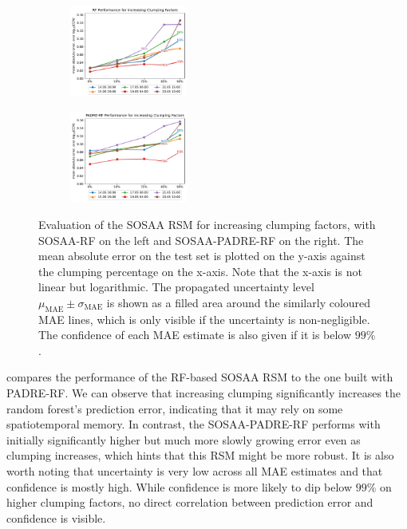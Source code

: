 \begin{figure}[H]
    \centering
    \begin{subfigure}
        \centering
        \includegraphics[width=0.425\textwidth]{evaluation/figures/results/clumped-generalisation-rf.pdf}
    \end{subfigure}
    \begin{subfigure}
        \centering
        \includegraphics[width=0.425\textwidth]{evaluation/figures/results/clumped-generalisation-padre-rf.pdf}
    \end{subfigure}

    \caption[Evaluation of the SOSAA RSM for increasing Clumping Factors]{Evaluation of the SOSAA RSM for increasing clumping factors, with SOSAA-RF on the left and SOSAA-PADRE-RF on the right. The mean absolute error on the test set is plotted on the y-axis against the clumping percentage on the x-axis. Note that the x-axis is not linear but logarithmic. The propagated uncertainty level $\mu_{\text{MAE}} \pm \sigma_{\text{MAE}}$ is shown as a filled area around the similarly coloured MAE lines, which is only visible if the uncertainty is non-negligible. The confidence of each MAE estimate is also given if it is below $99\%$.}
    \label{fig:sosaa-rsm-clumping}
\end{figure}

\noindent {} compares the performance of the RF-based SOSAA RSM to the one built with PADRE-RF. We can observe that increasing clumping significantly increases the random forest's prediction error, indicating that it may rely on some spatiotemporal memory. In contrast, the SOSAA-PADRE-RF performs with initially significantly higher but much more slowly growing error even as clumping increases, which hints that this RSM might be more robust. It is also worth noting that uncertainty is very low across all MAE estimates and that confidence is mostly high. While confidence is more likely to dip below $99\%$ on higher clumping factors, no direct correlation between prediction error and confidence is visible.

